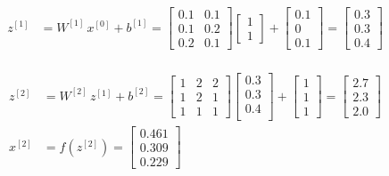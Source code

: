 \documentclass[12pt]{article}
\begin{document}
\begin{enumerate}
\vspace{10pt}
\begin{equation*}
    \begin{aligned}
        z^{[1]} &= W^{[1]} \, x^{[0]} + b^{[1]} = \begin{bmatrix}
            0.1 & 0.1 \\
            0.1 & 0.2 \\
            0.2 & 0.1
        \end{bmatrix} \begin{bmatrix}
            1 \\
            1
        \end{bmatrix} + \begin{bmatrix}
            0.1 \\
            0 \\
            0.1
        \end{bmatrix} = \begin{bmatrix}
            0.3 \\
            0.3 \\
            0.4
        \end{bmatrix} \\
    \end{aligned}
\end{equation*}

\begin{equation*}
    \begin{aligned}
        z^{[2]} &= W^{[2]} \, z^{[1]} + b^{[2]} = \begin{bmatrix}
            1 & 2 & 2 \\
            1 & 2 & 1 \\
            1 & 1 & 1
        \end{bmatrix} \begin{bmatrix}
            0.3 \\  
            0.3 \\
            0.4 \\
        \end{bmatrix} + \begin{bmatrix}
            1 \\
            1 \\
            1
        \end{bmatrix} = \begin{bmatrix}
            2.7 \\
            2.3 \\
            2.0
        \end{bmatrix} \\
        x^{[2]} &= f\left(z^{[2]}\right) = \begin{bmatrix}
            0.461 \\
            0.309 \\
            0.229
        \end{bmatrix}
    \end{aligned}
\end{equation*}



\end{enumerate}
\end{document}
